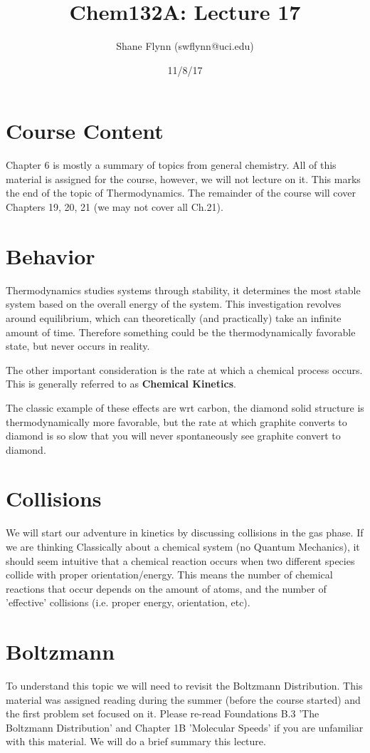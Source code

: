 \documentclass{article}
\title{Chem132A: Lecture 17}
\author{Shane Flynn (swflynn@uci.edu)}
\date{11/8/17}
\begin{document}
\maketitle

\section*{Course Content}
Chapter 6 is mostly a  summary of topics from general chemistry.
All of this material is assigned for the course, however, we will not lecture on it.
This marks the end of the topic of Thermodynamics.
The remainder of the course will cover Chapters 19, 20, 21 (we may not cover all Ch.21). 

\section*{Behavior}
Thermodynamics studies systems through stability, it determines the most stable system based on the overall energy of the system. 
This investigation revolves around equilibrium, which can theoretically (and practically) take an infinite amount of time.
Therefore something could be the thermodynamically favorable state, but never occurs in reality.

The other important consideration is the rate at which a chemical process occurs. 
This is generally referred to as \textbf{Chemical  Kinetics}.

The classic example of these effects are wrt carbon,  the diamond solid structure  is thermodynamically more favorable, but the rate at which graphite converts to diamond is so slow that you will never spontaneously see graphite convert to diamond. 

\section*{Collisions}
We will start our adventure in kinetics by discussing collisions in the gas phase.
If we are thinking Classically about a chemical system (no Quantum Mechanics), it should seem intuitive that a chemical reaction occurs when two different species collide with proper orientation/energy.
This means the number of chemical reactions that occur depends on the amount of atoms, and the number of 'effective' collisions (i.e. proper energy, orientation, etc). 

\section*{Boltzmann}
To understand this topic we will need to revisit the Boltzmann Distribution. 
This material was assigned reading during the summer (before the course started) and the first problem set focused on it.
Please re-read Foundations B.3 'The Boltzmann Distribution' and Chapter 1B 'Molecular Speeds' if you are unfamiliar with this material. 
We will do a brief summary this lecture. 
\end{document}
